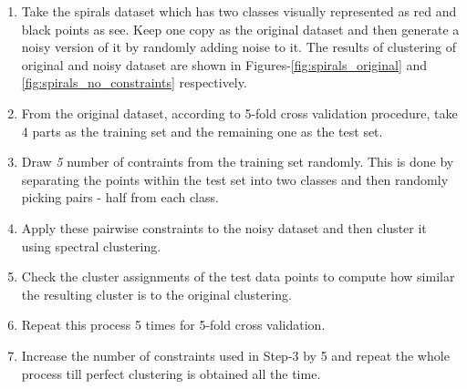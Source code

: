 \begin{enumerate}
 \item Take the spirals dataset which has two classes visually represented as red and black points as see. Keep one copy as the original dataset and then generate a noisy version of it by randomly 
adding noise to it. The results of clustering of original and noisy dataset are shown in Figures-\ref{fig:spirals_original} and \ref{fig:spirals_no_constraints} respectively.
 \item From the original dataset, according to 5-fold cross validation procedure, take 4 parts as the training set and the remaining one as the test set.
 \item Draw \textit{5} number of contraints from the training set randomly. This is done by separating the points within the test set into two classes and then randomly picking pairs - half from each class.
 \item Apply these pairwise constraints to the noisy dataset and then cluster it using spectral clustering.
 \item Check the cluster assignments of the test data points to compute how similar the resulting cluster is to the original clustering.
 \item Repeat this process 5 times for 5-fold cross validation.
 \item Increase the number of constraints used in Step-3 by 5 and repeat the whole process till perfect clustering is obtained all the time.
\end{enumerate}


\begin{figure}[p]
\centering
{}
\label{fig:spirals_visual}
\caption[Visual indication of Spirals dataset clustering quality improvement with increasing number of known constraints]{}
\end{figure}


